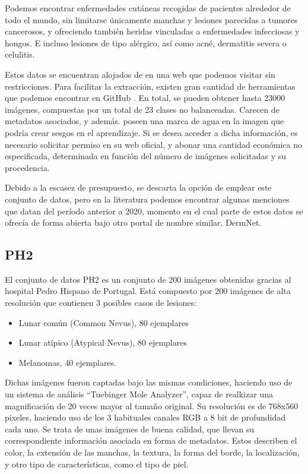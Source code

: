Podemos encontrar enfermedades cutáneas recogidas de pacientes alrededor de todo el mundo, sin limitarse únicamente manchas  y lesiones parecidas a tumores cancerosos, y ofreciendo también heridas vinculadas a enfermedades infecciosas y hongos.  E incluso lesiones de tipo alérgico, así como acné, dermatitis severa o celulitis.

Estos datos se encuentran alojados de en una web que podemos visitar sin restricciones. Para facilitar la extracción,  existen gran cantidad de herramientas que podemos encontrar en GitHub \cite{githubdermnet}. En total, se pueden obtener hasta 23000 imágenes, compuestas por un total de 23 clases no balanceadas. Carecen de metadatos asociados, y además. poseen una marca de agua en la imagen que podría crear sesgos en el aprendizaje. Si se desea acceder a dicha información, es necesario solicitar permiso en su web oficial, y abonar una cantidad económica no especificada, determinada en función del  número de imágenes solicitadas y su procedencia.

Debido a la escasez de presupuesto, se descarta la opción de emplear este conjunto de datos, pero en la literatura podemos encontrar algunas menciones que datan del período anterior a 2020, momento en el cual parte de estos datos se ofrecía de forma abierta bajo otro portal de nombre similar, DermNet.


\subsection{ PH2}
El conjunto de datos PH2 \cite{ph2} es un conjunto de 200 imágenes obtenidas gracias al hospital Pedro Hispano de Portugal. Está compuesto por 200 imágenes de alta resolución que contienen 3 posibles casos de lesiones:
\begin{itemize}
	\item Lunar común (Common Nevus), 80 ejemplares
	\item Lunar atípico (Atypical Nevus), 80 ejemplares
	\item Melanomas, 40 ejemplares.
\end{itemize}

Dichas imágenes fueron captadas bajo las mismas condiciones, haciendo uso de un  sistema de análisis ``Tuebinger Mole Analyzer'', capaz de realkizar una magnificación de 20 veces mayor al tamaño original. Su resolución es de  768x560 pixeles, haciendo uso de los 3 habituales canales RGB a 8 bit de profundidad cada uno. Se trata de unas imágenes de buena calidad, que llevan su correspondiente información asociada en forma de metadatos. Estos describen el color, la extensión de las manchas, la textura, la forma del borde, la localización, y otro tipo de características, como el tipo de piel.

